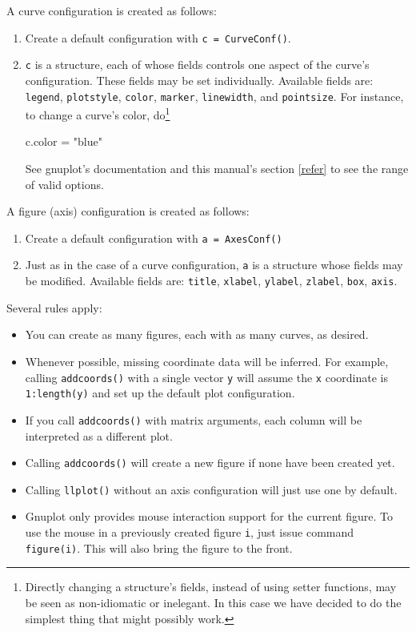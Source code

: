 \documentclass[11pt]{article}
\newcommand{\cmd}[1]{\texttt{#1}}
\begin{document}
A curve configuration is created as follows:
\begin{enumerate}
	\item Create a default configuration with \cmd{c = CurveConf()}.
	\item \cmd{c} is a structure, each of whose fields controls one aspect of
		the curve's configuration. These fields may be set individually.
		Available fields are: \cmd{legend}, \cmd{plotstyle}, \cmd{color},
		\cmd{marker}, \cmd{linewidth}, and \cmd{pointsize}. For instance, to
		change a curve's color, do\footnote{Directly changing a structure's
		fields, instead of using setter functions, may be seen as non-idiomatic
		or inelegant. In this case we have decided to do the simplest thing
		that might possibly work.}

\begin{juliacode}
c.color = "blue"
\end{juliacode}

See gnuplot's documentation and this manual's section \ref{refer} to see the
range of valid options.

\end{enumerate}

A figure (axis) configuration is created as follows:
\begin{enumerate}
	\item Create a default configuration with \cmd{a = AxesConf()}
	\item Just as in the case of a curve configuration, \cmd{a} is a structure
		whose fields may be modified. Available fields are: \cmd{title},
		\cmd{xlabel}, \cmd{ylabel}, \cmd{zlabel}, \cmd{box}, \cmd{axis}.
\end{enumerate}

Several rules apply:
\begin{itemize}
	\item You can create as many figures, each with as many curves, as desired.
	\item Whenever possible, missing coordinate data will be inferred. For
		example, calling \cmd{addcoords()} with a single vector \cmd{y}
		will assume the \cmd{x} coordinate is \cmd{1:length(y)} and set up the
		default plot configuration.
	\item If you call \cmd{addcoords()} with matrix arguments, each column will
		be interpreted as a different plot.
	\item Calling \cmd{addcoords()} will create a new figure if none have been
		created yet.
	\item Calling \cmd{llplot()} without an axis configuration will just use one
		by default.
	\item Gnuplot only provides mouse interaction support for the current
		figure. To use the mouse in a previously created figure \cmd{i}, just
		issue command \cmd{figure(i)}. This will also bring the figure to the
		front.
\end{itemize}
\end{document}
